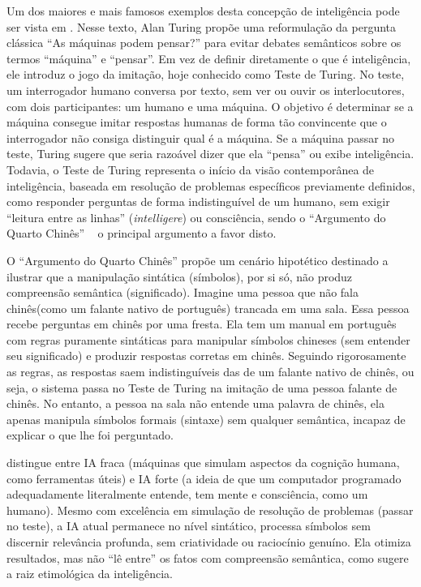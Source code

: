 Um dos maiores e mais famosos exemplos desta concepção de inteligência pode ser vista em . Nesse texto, Alan Turing propõe uma reformulação da pergunta clássica ``As máquinas podem pensar?'' para evitar debates semânticos sobre os termos ``máquina'' e ``pensar''. Em vez de definir diretamente o que é inteligência, ele introduz o jogo da imitação, hoje conhecido como Teste de Turing. No teste, um interrogador humano conversa por texto, sem ver ou ouvir os interlocutores, com dois participantes: um humano e uma máquina. O objetivo é determinar se a máquina consegue imitar respostas humanas de forma tão convincente que o interrogador não consiga distinguir qual é a máquina. Se a máquina passar no teste, Turing sugere que seria razoável dizer que ela ``pensa'' ou exibe inteligência. Todavia, o Teste de Turing  representa o início da visão contemporânea de inteligência, baseada em resolução de problemas específicos previamente definidos, como responder perguntas de forma indistinguível de um humano, sem exigir ``leitura entre as linhas'' (\textit{intelligere}) ou consciência, sendo o ``Argumento do Quarto Chinês'' \ \cite{searle1980minds} o principal argumento a favor disto.

O ``Argumento do Quarto Chinês'' propõe um cenário hipotético destinado a ilustrar que a manipulação sintática (símbolos), por si só, não produz compreensão semântica (significado). Imagine uma pessoa que não fala chinês(como um falante nativo de português) trancada em uma sala. Essa pessoa recebe perguntas em chinês por uma fresta. Ela tem um manual em português com regras puramente sintáticas para manipular símbolos chineses (sem entender seu significado) e produzir respostas corretas em chinês. Seguindo rigorosamente as regras, as respostas saem indistinguíveis das de um falante nativo de chinês, ou seja, o sistema passa no Teste de Turing na imitação de uma pessoa falante de chinês. No entanto, a pessoa na sala não entende uma palavra de chinês, ela apenas manipula símbolos formais (sintaxe) sem qualquer semântica, incapaz de explicar o que lhe foi perguntado.

 distingue entre IA fraca (máquinas que simulam aspectos da cognição humana, como ferramentas úteis) e IA forte (a ideia de que um computador programado adequadamente literalmente entende, tem mente e consciência, como um humano). Mesmo com excelência em simulação de resolução de problemas (passar no teste), a IA atual permanece no nível sintático, processa símbolos sem discernir relevância profunda, sem criatividade ou raciocínio genuíno. Ela otimiza resultados, mas não ``lê entre'' os fatos com compreensão semântica, como sugere a raiz etimológica da inteligência. 

